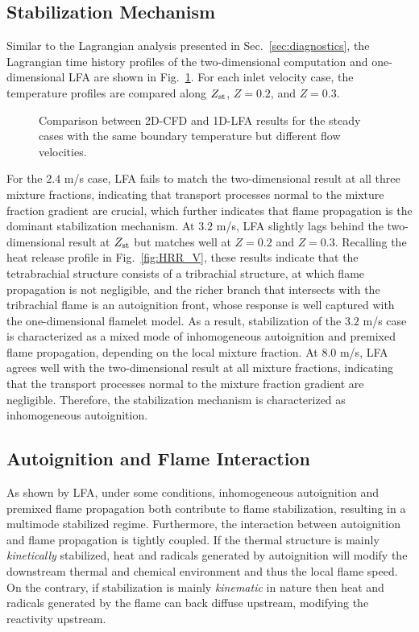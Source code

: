 \subsection{Stabilization Mechanism} 

Similar to the Lagrangian analysis presented in Sec.~\ref{sec:diagnostics}, the Lagrangian time history profiles of the two-dimensional computation and one-dimensional LFA are shown in Fig.~\ref{fig:LFA_V}.  For each inlet velocity case, the temperature profiles are compared along $Z_{\rm st}$, $Z = 0.2$, and $Z = 0.3$.

\begin{figure}
  \centering
  \scriptsize
  \resizebox{1.0\textwidth}{!}{}
  \normalsize
  \caption{Comparison between 2D-CFD and 1D-LFA results for the steady cases with the same boundary temperature but different flow velocities.}
  \label{fig:LFA_V}
\end{figure}

For the $2.4$ m/s case, LFA fails to match the two-dimensional result at all three mixture fractions, indicating that transport processes normal to the mixture fraction gradient are crucial, which further indicates that flame propagation is the dominant stabilization mechanism.  At $3.2$ m/s, LFA slightly lags behind the two-dimensional result at $Z_{\rm st}$ but matches well at $Z = 0.2$ and $Z = 0.3$.  Recalling the heat release profile in Fig.~\ref{fig:HRR_V}, these results indicate that the tetrabrachial structure consists of a tribrachial structure, at which flame propagation is not negligible, and the richer branch that intersects with the tribrachial flame is an autoignition front, whose response is well captured with the one-dimensional flamelet model.  As a result, stabilization of the $3.2$ m/s case is characterized as a mixed mode of inhomogeneous autoignition and premixed flame propagation, depending on the local mixture fraction.  At $8.0$ m/s, LFA agrees well with the two-dimensional result at all mixture fractions, indicating that the transport processes normal to the mixture fraction gradient are negligible.  Therefore, the stabilization mechanism is characterized as inhomogeneous autoignition.

\subsection{Autoignition and Flame Interaction}

As shown by LFA, under some conditions, inhomogeneous autoignition and premixed flame propagation both contribute to flame stabilization, resulting in a multimode stabilized regime.  Furthermore, the interaction between autoignition and flame propagation is tightly coupled.  If the thermal structure is mainly \emph{kinetically} stabilized, heat and radicals generated by autoignition will modify the  downstream thermal and chemical environment and thus the local flame speed.  On the contrary, if stabilization is mainly \emph{kinematic} in nature then heat and radicals generated by the flame can back diffuse upstream, modifying the reactivity upstream.  

